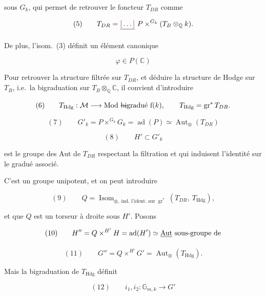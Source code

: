 \documentclass[11pt,a4paper]{article}
\begin{document}
sous $G_{k}$, qui permet de retrouver le foncteur $T_{DR}$ comme

\[ (5) \qquad T_{DR} = \struck{\ill{}}\ P \times^{G_{k}} (T_{B} \otimes_{\mathbb{Q}} k) . \]

De plus, \struck{\ill{}} l'isom.\ (3) définit un élément canonique

\[ \varphi \in P(\mathbb{C}) \]


Pour retrouver la structure filtrée sur $T_{DR}$, et déduire la structure de
Hodge sur $T_{B}$, i.e.\ la bigraduation sur
$T_{B} \otimes_{\mathbb{Q}} \mathbb{C}$, il convient d'introduire

\[ (6) \qquad T_{\mathrm{Hdg}} : \mathcal{M} \longrightarrow \text{Mod \struck{bi}gradué f}(k) , \qquad T_{\mathrm{Hdg}} = \operatorname{gr}^{*} T_{DR} . \]

\struck{\ill{}}

\[ (7) \qquad G'_{k} = P \times^{G_{k}} G_{k} = \operatorname{ad}(P) \simeq \operatorname{Aut}_{\otimes}(T_{DR}) \]

 \[ (8) \qquad H' \subset G'_{k} \]

est le groupe des  Aut de $T_{DR}$ respectant la filtration et qui
induisent l'identité sur le gradué associé.


C'est un groupe unipotent, et on peut introduire

\[ (9) \qquad Q = \operatorname{Isom}_{\otimes,\ \text{ind.\ l'ident.\ sur } \operatorname{gr}^{*}}(T_{DR},\ T_{\mathrm{Hdg}}) , \]

et \ill{} que $Q$ est un torseur à droite sous $H'$. Posons

\[ (10) \qquad H'' = Q \times^{H'} H = \operatorname{ad}(H') \simeq \struck{\operatorname{Aut}}\ \text{sous-groupe de} \]


\[ (11) \qquad G'' = Q \times^{H'} G' = \operatorname{Aut}_{\otimes}(T_{\mathrm{Hdg}}) . \]

Mais la bigraduation de $T_{\mathrm{Hdg}}$ définit

\[ (12) \qquad i_{1}, i_{2} : \mathbb{G}_{m,k} \longrightarrow G' \]

\end{document}
